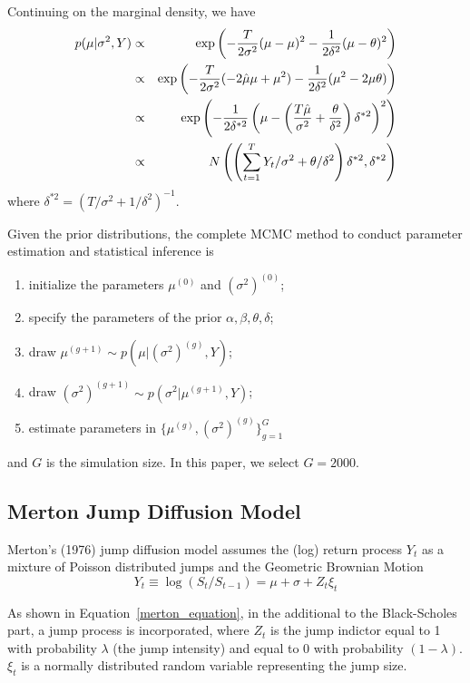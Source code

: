 \documentclass[11pt,reqno,final]{amsart}
\def\exp{\hbox{\rm exp}}
\begin{document}
Continuing on the marginal density, we have
\begin{eqnarray*}
p(\mu|\sigma^2, Y) &\propto& \exp\left(-\frac{T}{2\sigma^2}(\mu-\mu)^2-\frac{1}{2\delta^2}(\mu-\theta)^2\right) \\
                   &\propto& \exp\left(-\frac{T}{2\sigma^2}(-2\hat{\mu}\mu+\mu^2)-\frac{1}{2\delta^2}(\mu^2-2\mu\theta)\right) \\
                   &\propto& \exp\left(-\frac{1}{2\delta^{*2}} \left( \mu-\left(\frac{T\hat{\mu}}{\sigma^2} + \frac{\theta}{\delta^2}\right)\delta^{*2} \right)^2 \right) \\
                   &\propto& N\left( \left( \sum_{t=1}^T Y_t / \sigma^2 + \theta/\delta^2 \right)\delta^{*2}, \delta^{*2} \right)
\end{eqnarray*}
where $\delta^{*2} = (T/\sigma^2+1/\delta^2)^{-1}$.

Given the prior distributions, the complete MCMC method to conduct parameter estimation and statistical inference is
\begin{enumerate}
    \item initialize the parameters $\mu^{(0)}$ and $(\sigma^2)^{(0)}$;
    \item specify the parameters of the prior $\alpha, \beta, \theta, \delta$;
    \item draw $\mu^{(g+1)} \sim p(\mu|(\sigma^2)^{(g)}, Y)$;
    \item draw $(\sigma^2)^{(g+1)} \sim p(\sigma^2|\mu^{(g+1)}, Y)$;
    \item estimate parameters in $\{\mu^{(g)}, (\sigma^2)^{(g)} \}_{g=1}^{G}$
\end{enumerate}
and $G$ is the simulation size. In this paper, we select $G=2000$.

\subsection{Merton Jump Diffusion Model}
Merton's (1976) jump diffusion model assumes the (log) return process $Y_t$ as a mixture of Poisson distributed jumps and the Geometric Brownian Motion
\begin{equation}\label{merton_equation}
Y_t \equiv \log(S_{t}/S_{t-1}) = \mu + \sigma + Z_t \xi_t
\end{equation}

As shown in Equation~\ref{merton_equation}, in the additional to the Black-Scholes part, a jump process is incorporated, where $Z_t$ is the jump indictor equal to 1 with probability $\lambda$ (the jump intensity) and equal to 0 with probability $(1-\lambda)$. $\xi_t$ is a normally distributed random variable representing the jump size.
\end{document}

